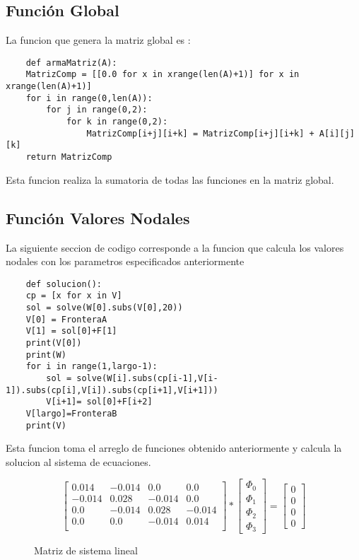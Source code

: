 \documentclass{article}
\begin{document}
\newpage

\subsection{Función Global}
La funcion que genera la matriz global es :
\begin{verbatim}
    def armaMatriz(A):
    MatrizComp = [[0.0 for x in xrange(len(A)+1)] for x in xrange(len(A)+1)]
    for i in range(0,len(A)):
        for j in range(0,2):
            for k in range(0,2):
                MatrizComp[i+j][i+k] = MatrizComp[i+j][i+k] + A[i][j][k]
    return MatrizComp
\end{verbatim}

Esta funcion realiza la sumatoria de todas las funciones en la matriz global.





\subsection{Función Valores Nodales}
La siguiente seccion de codigo corresponde a la funcion que calcula los valores nodales con los parametros especificados anteriormente

\begin{verbatim}
    def solucion():
    cp = [x for x in V]
    sol = solve(W[0].subs(V[0],20))
    V[0] = FronteraA
    V[1] = sol[0]+F[1]
    print(V[0])
    print(W)
    for i in range(1,largo-1):
        sol = solve(W[i].subs(cp[i-1],V[i-1]).subs(cp[i],V[i]).subs(cp[i+1],V[i+1]))
        V[i+1]= sol[0]+F[i+2]
    V[largo]=FronteraB
    print(V)
\end{verbatim}
Esta funcion toma el arreglo de funciones obtenido anteriormente y calcula la solucion al sistema de ecuaciones.

\begin{figure}[!h]
    \centering
    \[
    \begin{bmatrix}
        {0.014} & {-0.014} & {0.0} & {0.0}\\
        {-0.014} & {0.028} & {-0.014} & {0.0}\\
        {0.0} & {-0.014} & {0.028} & {-0.014}\\
        {0.0} & {0.0} & {-0.014} & {0.014}\\
    \end{bmatrix}
    *
    \begin{bmatrix}
        {\Phi_0}\\
        {\Phi_1}\\
        {\Phi_2}\\
        {\Phi_3}
    \end{bmatrix}
    =
    \begin{bmatrix}
        {0}\\
        {0}\\
        {0}\\
        {0}
    \end{bmatrix}
    \]
    \caption{Matriz de sistema lineal}

\end{figure}
\newpage
\end{document}
